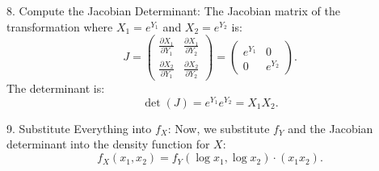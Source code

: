 \documentclass[10pt,letterpaper]{article}
\begin{document}
8. Compute the Jacobian Determinant: The Jacobian matrix of the transformation where \(X_1 = e^{Y_1}\) and \(X_2 = e^{Y_2}\) is:
   \[
   J = \begin{pmatrix}
   \frac{\partial X_1}{\partial Y_1} & \frac{\partial X_1}{\partial Y_2} \\
   \frac{\partial X_2}{\partial Y_1} & \frac{\partial X_2}{\partial Y_2}
   \end{pmatrix} = \begin{pmatrix}
   e^{Y_1} & 0 \\
   0 & e^{Y_2}
   \end{pmatrix}.
   \]
   The determinant is:
   \[
   \det(J) = e^{Y_1} e^{Y_2} = X_1 X_2.
   \]

9. Substitute Everything into \(f_X\): Now, we substitute \(f_Y\) and the Jacobian determinant into the density function for \(X\):
   \[
   f_X(x_1, x_2) = f_Y(\log x_1, \log x_2) \cdot (x_1 x_2).
   \]
\end{document}
